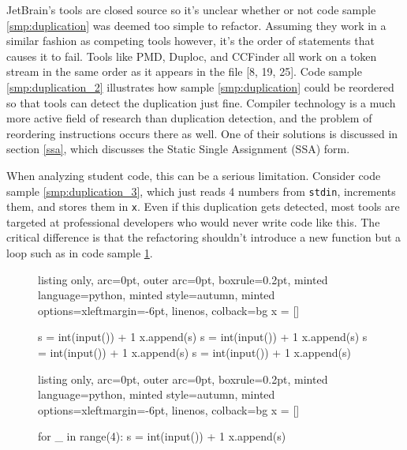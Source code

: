 \documentclass[a4paper, 16pt, oneside]{Thesis}
\begin{document}
\vspace{30pt}

JetBrain's tools are closed source so it's unclear whether or not code
sample \ref{smp:duplication} was deemed too simple to refactor. Assuming
they work in a similar fashion as competing tools however, it's the
order of statements that causes it to fail. Tools like PMD, Duploc, and
CCFinder all work on a token stream in the same order as it appears in
the file {[}8, 19, 25{]}. Code sample \ref{smp:duplication_2}
illustrates how sample \ref{smp:duplication} could be reordered so that
tools can detect the duplication just fine. Compiler technology is a
much more active field of research than duplication detection, and the
problem of reordering instructions occurs there as well. One of their
solutions is discussed in section \ref{ssa}, which discusses the Static
Single Assignment (SSA) form.

When analyzing student code, this can be a serious limitation. Consider
code sample \ref{smp:duplication_3}, which just reads 4 numbers from
\texttt{stdin}, increments them, and stores them in \texttt{x}. Even if
this duplication gets detected, most tools are targeted at professional
developers who would never write code like this. The critical difference
is that the refactoring shouldn't introduce a new function but a loop
such as in code sample \ref{smp:duplication_3_f}.

\begin{figure}[h]
\centering
\begin{minipage}{0.31\textwidth}
  \begin{tcblisting}{listing only, 
  arc=0pt,
  outer arc=0pt, 
  boxrule=0.2pt,
  minted language=python,
  minted style=autumn,
  minted options={xleftmargin=-6pt, linenos},
  colback=bg }
x = []

s = int(input()) + 1
x.append(s)
s = int(input()) + 1
x.append(s)
s = int(input()) + 1
x.append(s)
s = int(input()) + 1
x.append(s)

\end{tcblisting}
\label{smp:duplication_3}
\end{minipage}
\hspace{9pt}
\begin{minipage}{0.31\textwidth}
  \begin{tcblisting}{listing only, 
  arc=0pt,
  outer arc=0pt, 
  boxrule=0.2pt,
  minted language=python,
  minted style=autumn,
  minted options={xleftmargin=-6pt, linenos},
  colback=bg }
x = []

for _ in range(4):
  s = int(input()) + 1
  x.append(s)
\end{tcblisting}
\vspace{55pt}
 \label{smp:duplication_3_f}
\end{minipage}
\end{figure}
\end{document}
